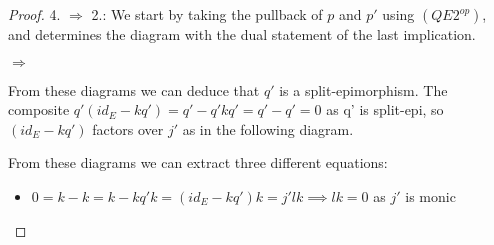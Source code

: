 \documentclass[12pt]{article}
\theoremstyle{definition}
\theoremstyle{remark}
\begin{document}
\begin{proof}
                4. $\Rightarrow$ 2.: We start by taking the pullback of $p$ and $p'$ using $(QE2^{op})$, and determines the diagram with the dual statement of the last implication.
                \begin{center}
                    \space $\Rightarrow$
                \end{center}
                From these diagrams we can deduce that $q'$ is a split-epimorphism. The composite $q'(id_E-kq')=q'-q'kq'=q'-q'=0$ as q' is split-epi, so $(id_E-kq')$ factors over $j'$ as in the following diagram.
                \begin{center}
                \end{center}
                From these diagrams we can extract three different equations:
                \begin{itemize}
                    \item $0=k-k=k-kq'k=(id_E-kq')k=j'lk \implies lk=0$ as $j'$ is monic

\end{itemize}
\end{proof}
\end{document}
